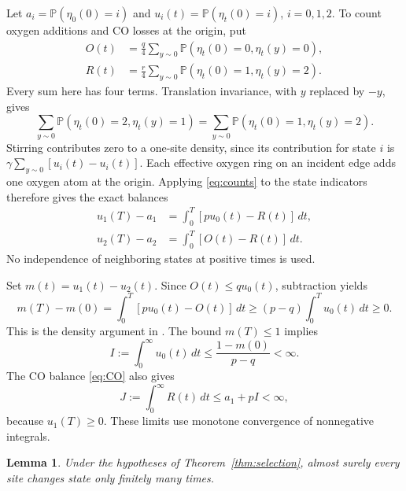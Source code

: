 \documentclass[11pt,a4paper]{article}
\newtheorem{lemma}[theorem]{Lemma}
\newcommand{\Prob}{\mathbb P}
\begin{document}
Let \(a_i=\Prob(\eta_0(0)=i)\) and
\(u_i(t)=\Prob(\eta_t(0)=i)\), \(i=0,1,2\). To count oxygen additions
and CO losses at the origin, put
\begin{align*}
 O(t)&=\frac q4\sum_{y\sim0}
       \Prob(\eta_t(0)=0,\eta_t(y)=0),\\
 R(t)&=\frac r4\sum_{y\sim0}
       \Prob(\eta_t(0)=1,\eta_t(y)=2).
\end{align*}
Every sum here has four terms. Translation invariance, with \(y\) replaced
by \(-y\), gives
\begin{equation}\label{eq:orientations}
 \sum_{y\sim0}\Prob(\eta_t(0)=2,\eta_t(y)=1)
 =\sum_{y\sim0}\Prob(\eta_t(0)=1,\eta_t(y)=2).
\end{equation}
Stirring contributes zero to a one-site density, since its contribution
for state \(i\) is
\(\gamma\sum_{y\sim0}[u_i(t)-u_i(t)]\).
Each effective oxygen ring on an incident edge adds one oxygen atom at
the origin. Applying \eqref{eq:counts} to the state indicators therefore
gives the exact balances
\begin{align}
 u_1(T)-a_1&=\int_0^T[p u_0(t)-R(t)]\,dt,\label{eq:CO}\\
 u_2(T)-a_2&=\int_0^T[O(t)-R(t)]\,dt.\label{eq:O}
\end{align}
No independence of neighboring states at positive times is used.

Set \(m(t)=u_1(t)-u_2(t)\). Since \(O(t)\le q u_0(t)\), subtraction yields
\begin{equation}\label{eq:drift}
 m(T)-m(0)
   =\int_0^T[p u_0(t)-O(t)]\,dt
   \ge(p-q)\int_0^T u_0(t)\,dt\ge0.
\end{equation}
This is the density argument in \cite{DS}. The bound \(m(T)\le1\) implies
\begin{equation}\label{eq:I}
 I:=\int_0^\infty u_0(t)\,dt
        \le\frac{1-m(0)}{p-q}<\infty.
\end{equation}
The CO balance \eqref{eq:CO} also gives
\begin{equation}\label{eq:J}
 J:=\int_0^\infty R(t)\,dt
      \le a_1+pI<\infty,
\end{equation}
because \(u_1(T)\ge0\). These limits use monotone convergence of
nonnegative integrals.

\begin{lemma}\label{lem:finite}
Under the hypotheses of Theorem~\ref{thm:selection}, almost surely every
site changes state only finitely many times.
\end{lemma}
\end{document}
